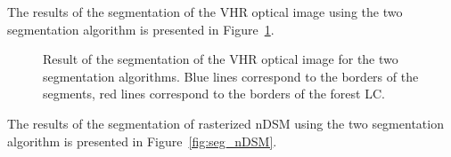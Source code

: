 The results of the segmentation of the VHR optical image using the two segmentation algorithm is presented in Figure~\ref{fig:seg_im}.

\begin{figure}[htbp]
\begin{center}
\begingroup
\captionsetup[subfigure]{width=0.4\textwidth}
\hspace*{0.05\textwidth}
\endgroup
\caption{Result of the segmentation of the VHR optical image for the two segmentation algorithms. Blue lines correspond to the borders of the segments, red lines correspond to the borders of the forest LC.}
\label{fig:seg_im}
\end{center}
\end{figure}

The results of the segmentation of rasterized nDSM using the two segmentation algorithm is presented in Figure~\ref{fig:seg_nDSM}.

